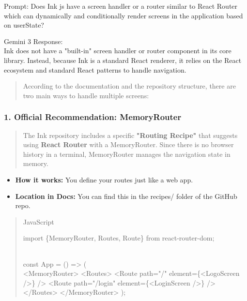 \documentclass[
]{article}
\begin{document}
Prompt: Does Ink js have a screen handler or a router similar to React
Router which can dynamically and conditionally render screens in the
application based on userState?

Gemini 3 Response:\\
Ink does not have a "built-in" screen handler or router component in its
core library. Instead, because Ink is a standard React renderer, it
relies on the React ecosystem and standard React patterns to handle
navigation.

\begin{quote}
According to the documentation and the repository structure, there are
two main ways to handle multiple screens:
\end{quote}

\hypertarget{official-recommendation-memoryrouter}{%
\subsubsection{\texorpdfstring{\textbf{1. Official Recommendation:
MemoryRouter}}{1. Official Recommendation: MemoryRouter}}\label{official-recommendation-memoryrouter}}

\begin{quote}
The Ink repository includes a specific \textbf{"Routing Recipe"} that
suggests using \textbf{React Router} with a MemoryRouter. Since there is
no browser history in a terminal, MemoryRouter manages the navigation
state in memory.
\end{quote}

\begin{itemize}
\item
  \textbf{How it works:} You define your routes just like a web app.
\item
  \textbf{Location in Docs:} You can find this in the recipes/ folder of
  the GitHub repo.
\end{itemize}

\begin{quote}
JavaScript

import \{MemoryRouter, Routes, Route\} from
\textquotesingle react-router-dom\textquotesingle;\\
\strut \\
const App = () =\textgreater{} (\\
\textless MemoryRouter\textgreater{}
\textless Routes\textgreater{}
\textless Route path="/" element=\{\textless LogoScreen /\textgreater\}
/\textgreater{}
\textless Route path="/login" element=\{\textless LoginScreen
/\textgreater\} /\textgreater{}
\textless/Routes\textgreater{}
\textless/MemoryRouter\textgreater{}
);
\end{quote}
\end{document}
